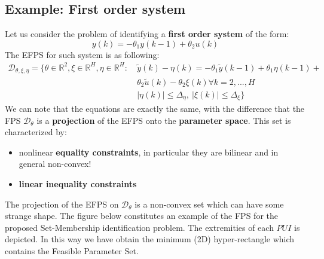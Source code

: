 \subsection{Example: First order system} 
Let us consider the problem of identifying a \textbf{first order system} of the form: 
\begin{equation*}
    y(k) = -\theta_1 y(k-1) + \theta_2 u(k)
\end{equation*}
The EFPS for such system is as following:
\begin{align*}
    \mathcal{D}_{\theta, \xi, \eta} = \big\{
        \theta \in \mathbb{R}^2, \xi \in \mathbb{R}^H, \eta \in \mathbb{R}^H: \ 
        &\tilde{y}(k)-\eta(k) = -\theta_1 \tilde{y}(k-1) + \theta_1 \eta(k-1) + \\
        &\theta_2 \tilde{u}(k) - \theta_2\xi(k) \forall k=2,..., H\\
        & \vert \eta(k) \vert \le \Delta_\eta, \ 
        \vert \xi(k) \vert \le \Delta_\xi
    \big\}
\end{align*}
We can note that the equations are exactly the same, with the difference that the FPS $\mathcal{D}_\theta$ is a \textbf{projection} of the EFPS onto the \textbf{parameter space}.
This set is characterized by: 
\begin{itemize}
    \itemsep0em
    \item nonlinear \textbf{equality constraints}, in particular they are bilinear and in general non-convex!
    \item \textbf{linear inequality constraints}
\end{itemize}
The projection of the EFPS on $\mathcal{D}_\theta$ is a non-convex set which can have some strange shape. The figure below constitutes an example of the FPS for the proposed Set-Membership identification problem. The extremities of each $PUI$ is depicted. In this way we have obtain the minimum (2D) hyper-rectangle which contains the Feasible Parameter Set.

